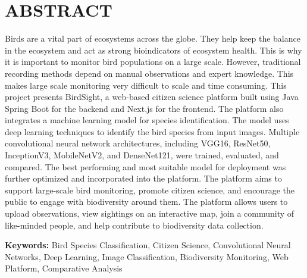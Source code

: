 \section*{\textbf{ABSTRACT}}

Birds are a vital part of ecosystems across the globe. 
They help keep the balance in the ecosystem and act as strong bioindicators of ecosystem health. 
This is why it is important to monitor bird populations on a large scale. 
However, traditional recording methods depend on manual observations and expert knowledge.
This makes large scale monitoring very difficult to scale and time consuming.
This project presents BirdSight, a web-based citizen science platform built using Java Spring Boot for the backend and Next.js for the frontend. 
The platform also integrates a machine learning model for species identification. The model uses deep learning techniques to identify the bird species from input images.
Multiple convolutional neural network architectures, including VGG16, ResNet50, InceptionV3, MobileNetV2, and DenseNet121, were trained, evaluated, and compared.
The best performing and most suitable model for deployment was further optimized and incorporated into the platform.
The platform aims to support large-scale bird monitoring, promote citizen science, and encourage the public to engage with biodiversity around them.
The platform allows users to upload observations, view sightings on an interactive map, join a community of like-minded people, and help contribute to biodiversity data collection.

\vspace{1em}
\noindent\textbf{Keywords:} Bird Species Classification, Citizen Science, Convolutional Neural Networks, Deep Learning, Image Classification, Biodiversity Monitoring, Web Platform, Comparative Analysis

\clearpage